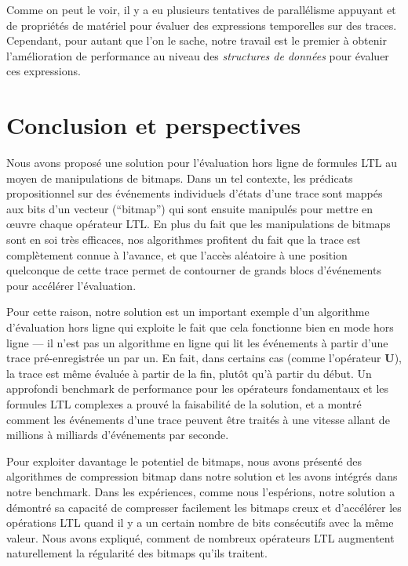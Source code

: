 Comme on peut le voir, il y a eu plusieurs tentatives de parallélisme appuyant et de propriétés de matériel pour évaluer des expressions temporelles sur des traces. Cependant, pour autant que l'on le sache, notre travail est le premier à obtenir l'amélioration de performance au niveau des \emph{structures de données} pour évaluer ces expressions.


\section{Conclusion et perspectives}\label{sec:bm:conclusion} %

Nous avons proposé une solution pour l'évaluation hors ligne de formules LTL au moyen de manipulations de bitmaps. Dans un tel contexte, les prédicats propositionnel sur des événements individuels d'états d'une trace sont mappés aux bits d'un vecteur (``bitmap'') qui sont ensuite manipulés pour mettre en \oe{}uvre chaque opérateur LTL. En plus du fait que les manipulations de bitmaps sont en soi très efficaces, nos algorithmes profitent du fait que la trace est complètement connue à l'avance, et que l'accès aléatoire à une position quelconque de cette trace permet de contourner de grands blocs d'événements pour accélérer l'évaluation.

Pour cette raison, notre solution est un important exemple d'un algorithme d'évaluation hors ligne qui exploite le fait que cela fonctionne bien en mode hors ligne --- il n'est pas un algorithme en ligne qui lit les événements à partir d'une trace pré-enregistrée un par un. En fait, dans certains cas (comme l'opérateur \textbf{U}), la trace est même évaluée à partir de la fin, plutôt qu'à partir du début. Un approfondi benchmark de performance pour les opérateurs fondamentaux et les formules LTL complexes a prouvé la faisabilité de la solution, et a montré comment les événements d'une trace peuvent être traités à une vitesse allant de millions à milliards d'événements par seconde.

Pour exploiter davantage le potentiel de bitmaps, nous avons présenté des algorithmes de compression bitmap dans notre solution et les avons intégrés dans notre benchmark. Dans les expériences, comme nous l'espérions, notre solution a démontré sa capacité de compresser facilement les bitmaps creux et d'accélérer les opérations LTL quand il y a un certain nombre de bits consécutifs avec la même valeur. Nous avons expliqué, comment de nombreux opérateurs LTL augmentent naturellement la régularité des bitmaps qu'ils traitent.

